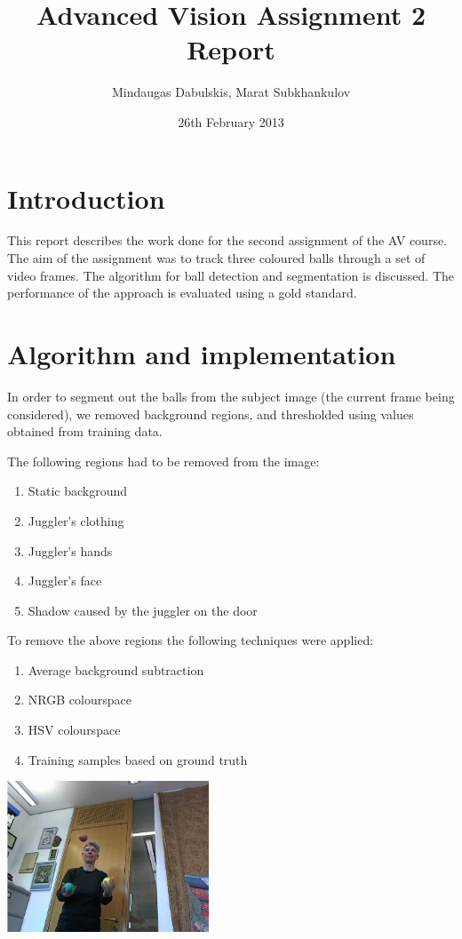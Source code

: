 \documentclass[10pt,a4paper,oneclumn]{article}
\title{Advanced Vision Assignment 2 Report}  %
\author{Mindaugas Dabulskis, Marat Subkhankulov}                      %
\date{26th February 2013}                 %
\begin{document}
\maketitle  %
%
\section{Introduction}

This report describes the work done for the second assignment of the AV course.
The aim of the assignment was to track three coloured balls through a set of video frames.
The algorithm for ball detection and segmentation is discussed. 
The performance of the approach is evaluated using a gold standard.

\section{Algorithm and implementation}

In order to segment out the balls from the subject image (the current frame being considered), we removed background regions, and thresholded using values obtained from training data.

The following regions had to be removed from the image: 
\begin{enumerate}
\item Static background
\item Juggler's clothing
\item Juggler's hands
\item Juggler's face
\item Shadow caused by the juggler on the door
\end{enumerate}

To remove the above regions the following techniques were applied:
\begin{enumerate}
\item Average background subtraction
\item NRGB colourspace
\item HSV colourspace
\item Training samples based on ground truth
\end{enumerate}

\begin{center}
  \includegraphics[width=6cm]{figures/original.png}
\end{center}
\end{document}
